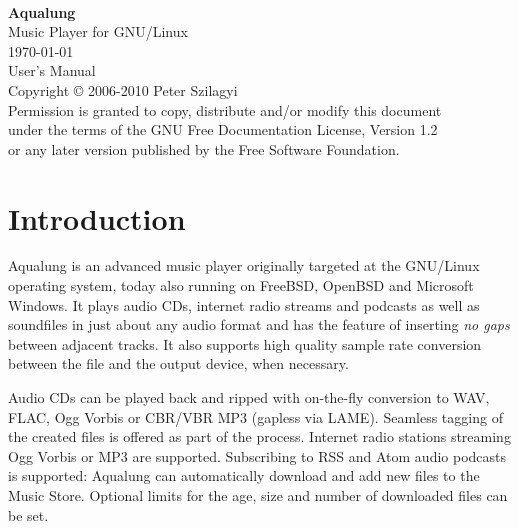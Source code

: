 \documentclass[10pt,english]{article}
\begin{document}
\begin{titlepage}
\begin{center}
\hspace{0mm}
\vspace{10mm}\\
{\Huge\bf Aqualung}
\vspace{3mm}\\
{\LARGE Music Player for GNU/Linux}
\vspace{10mm}\\
\today
\vspace{70mm}\\
{\Huge User's Manual}
\vspace{60mm}\\
Copyright \copyright{} 2006-2010 Peter Szilagyi
\vspace{5mm}\\
Permission is granted to copy, distribute and/or modify this document\\
under the terms of the GNU Free Documentation License, Version 1.2\\
or any later version published by the Free Software Foundation.
\end{center}
\end{titlepage}
\tableofcontents{}
\newpage{}


\section{Introduction\label{idp281392}}



\noindent Aqualung is an advanced music player originally targeted at
the GNU/Linux operating system, today also running on FreeBSD,
OpenBSD and Microsoft Windows. It plays audio CDs, internet
radio streams and podcasts as well as soundfiles in just about
any audio format and has the feature of inserting \emph{no
gaps} between adjacent tracks. It also supports high
quality sample rate conversion between the file and the output
device, when necessary.




Audio CDs can be played back and ripped with on-the-fly
conversion to WAV, FLAC, Ogg Vorbis or CBR/VBR MP3 (gapless via
LAME). Seamless tagging of the created files is offered as part
of the process. Internet radio stations streaming Ogg Vorbis or
MP3 are supported. Subscribing to RSS and Atom audio podcasts is
supported: Aqualung can automatically download and add new files
to the Music Store. Optional limits for the age, size and number
of downloaded files can be set.
\end{document}
